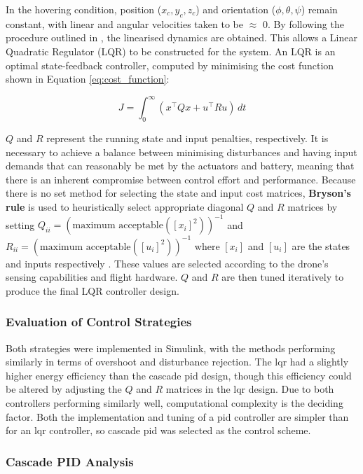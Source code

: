 In the hovering condition, position (\(x_c, y_c, z_c\)) and orientation (\(\phi, \theta, \psi\)) remain constant, with linear and angular velocities taken to be $\approx$ 0. By following the procedure outlined in \cite{cengiz2024quadcopter}, the linearised dynamics are obtained. This allows a Linear Quadratic Regulator (LQR) to be constructed for the system. An LQR is an optimal state-feedback controller, computed by minimising the cost function shown in Equation \ref{eq:cost_function}:

\begin{equation} \label{eq:cost_function}
J = \int_0^\infty \left( x^\top Q x + u^\top R u \right) \, dt 
\end{equation}

$Q$ and $R$ represent the running state and input penalties, respectively. It is necessary to achieve a balance between minimising disturbances and having input demands that can reasonably be met by the actuators and battery, meaning that there is an inherent compromise between control effort and performance. Because there is no set method for selecting the state and input cost matrices, \textbf{Bryson's rule} is used to heuristically select appropriate diagonal $Q$ and $R$ matrices by setting $Q_{ii} = ({\text{maximum acceptable}( [x_i]^2 )})^{-1}$ and $R_{ii} = ({\text{maximum acceptable}( [u_i]^2 )})^{-1}$ where $[x_i]$ and $[u_i]$ are the states and inputs respectively \cite{chibum2014adv09designofsfb1}. These values are selected according to the drone's sensing capabilities and flight hardware. $Q$ and $R$ are then tuned iteratively to produce the final LQR controller design.

\subsubsection{Evaluation of Control Strategies}

Both strategies were implemented in Simulink, with the methods performing similarly in terms of overshoot and disturbance rejection. The \gls{lqr} had a slightly higher energy efficiency than the cascade \gls{pid} design, though this efficiency could be altered by adjusting the $Q$ and $R$ matrices in the \gls{lqr} design. Due to both controllers performing similarly well, computational complexity is the deciding factor. Both the implementation and tuning of a \gls{pid} controller are simpler than for an \gls{lqr} controller, so cascade \gls{pid} was selected as the control scheme.

\subsubsection{Cascade PID Analysis}
\label{sec:cascpid}

